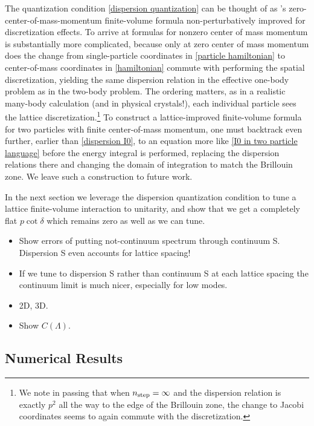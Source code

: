 The quantization condition \eqref{dispersion quantization} can be thought of as \Luscher's zero-center-of-mass-momentum finite-volume formula non-perturbatively improved for discretization effects.
To arrive at formulas for nonzero center of mass momentum is substantially more complicated, because only at zero center of mass momentum does the change from single-particle coordinates in \eqref{particle hamiltonian} to center-of-mass coordinates in \eqref{hamiltonian} commute with performing the spatial discretization, yielding the same dispersion relation in the effective one-body problem as in the two-body problem.
The ordering matters, as in a realistic many-body calculation (and in physical crystals!), each individual particle sees the lattice discretization.\footnote{
We note in passing that when ${n_\text{step}}=\infty$ and the dispersion relation is exactly $p^2$ all the way to the edge of the Brillouin zone, the change to Jacobi coordinates seems to again commute with the discretization.}
To construct a lattice-improved finite-volume formula for two particles with finite center-of-mass momentum, one must backtrack even further, earlier than \eqref{dispersion I0}, to an equation more like \eqref{I0 in two particle language} before the energy integral is performed, replacing the dispersion relations there and changing the domain of integration to match the Brillouin zone.
We leave such a construction to future work.

In the next section we leverage the dispersion quantization condition to tune a lattice finite-volume interaction to unitarity, and show that we get a completely flat $p \cot \delta$ which remains zero as well as we can tune.

\begin{itemize}
    \item Show errors of putting not-continuum spectrum through continuum S.  Dispersion S even accounts for lattice spacing!
    \item If we tune to dispersion S rather than continuum S at each lattice spacing the continuum limit is much nicer, especially for low modes.
    \item 2D, 3D.
    \item Show $C(\Lambda)$.
\end{itemize}

\subsection{Numerical Results}

